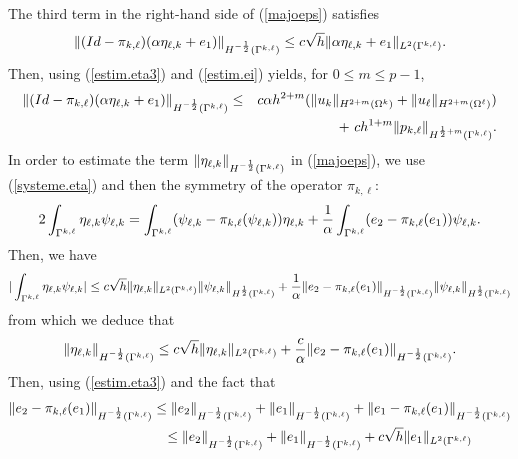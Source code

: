 \documentclass[final]{siamltex}
\begin{document}
The third term in the right-hand side of (\ref{majoeps}) satisfies
\begin{eqnarray}
\|(Id-\pi_{k,\ell})(\alpha \eta_{\ell,k} +e_1) \|_{H^{-{1 \over
2}}(\Gamma^{k,\ell})} \le c \sqrt{h} \|\alpha \eta_{\ell,k} +e_1
\|_{L^2(\Gamma^{k,\ell})}. \nonumber
\end{eqnarray}
Then, using (\ref{estim.eta3}) and (\ref{estim.ei}) yields, for $0\le m \le p-1$,
\begin{eqnarray}
\|(Id-\pi_{k,\ell})(\alpha \eta_{\ell,k} +e_1) \|_{H^{-{1 \over
2}}(\Gamma^{k,\ell})}
&\le& c\alpha h^{2+m}
(\|u_k\|_{H^{2+m}(\Omega^k)}+\|u_{\ell}\|_{H^{2+m}(\Omega^{\ell})})\nonumber\\&
&+ \ c h^{1+m} \| p_{k,\ell} \|_{H^{{1 \over 2}+m}(\Gamma^{k,\ell})}.
\nonumber
\end{eqnarray}
In order to estimate the term $\|\eta_{\ell,k} \|_{H^{-{1 \over
2}}(\Gamma^{k,\ell})}$ in (\ref{majoeps}), we
use (\ref{systeme.eta}) and then the symmetry of the operator $\pi_{k,\ell}$:
\begin{eqnarray}
2\int_{\Gamma^{k,\ell}} \eta_{\ell,k} \psi_{\ell,k} = \int_{\Gamma^{k,\ell}}
(\psi_{\ell,k}-\pi_{k,\ell}(\psi_{\ell,k}))   \eta_{\ell,k}
+{1 \over \alpha} \int_{\Gamma^{k,\ell}} (e_2 -
\pi_{k,\ell}(e_1)) \psi_{\ell,k}.
\nonumber
\end{eqnarray}
Then, we have
\begin{eqnarray}
|\int_{\Gamma^{k,\ell}} \eta_{\ell,k} \psi_{\ell,k}|
\le c\sqrt{h}\|\eta_{\ell,k}\|_{L^2(\Gamma^{k,\ell})}
\|\psi_{\ell,k}\|_{H^{1 \over 2}(\Gamma^{k,\ell})}
+{1\over \alpha}\|e_2 - \pi_{k,\ell}(e_1)\|_{H^{-{1 \over 2}}(\Gamma^{k,\ell})}
\|\psi_{\ell,k}\|_{H^{1 \over 2}(\Gamma^{k,\ell})}
\nonumber
\end{eqnarray}
from which we deduce that
\begin{eqnarray}\label{estim.etamoins1demi}
\|\eta_{\ell,k}\|_{H^{-{1 \over 2}}(\Gamma^{k,\ell})}
\le c \sqrt{h}\|\eta_{\ell,k}\|_{L^2(\Gamma^{k,\ell})}+ {c\over \alpha}
\|e_2 - \pi_{k,\ell}(e_1)\|_{H^{-{1
\over 2}}(\Gamma^{k,\ell})}.
\end{eqnarray}
Then, using (\ref{estim.eta3}) and the fact that
\begin{eqnarray}\label{estim.e2pie1}
\|e_2 - \pi_{k,\ell}(e_1)\|_{H^{-{1 \over 2}}(\Gamma^{k,\ell})}
\le \|e_2\|_{H^{-{1 \over 2}}(\Gamma^{k,\ell})}
+\|e_1\|_{H^{-{1 \over 2}}(\Gamma^{k,\ell})}
+\|e_1- \pi_{k,\ell}(e_1)\|_{H^{-{1 \over 2}}(\Gamma^{k,\ell})} \nonumber\\
\le \|e_2\|_{H^{-{1 \over 2}}(\Gamma^{k,\ell})}
+\|e_1\|_{H^{-{1 \over 2}}(\Gamma^{k,\ell})}
+c\sqrt{h} \|e_1\|_{L^2(\Gamma^{k,\ell})} \hspace{10mm}
\end{eqnarray}
\end{document}
